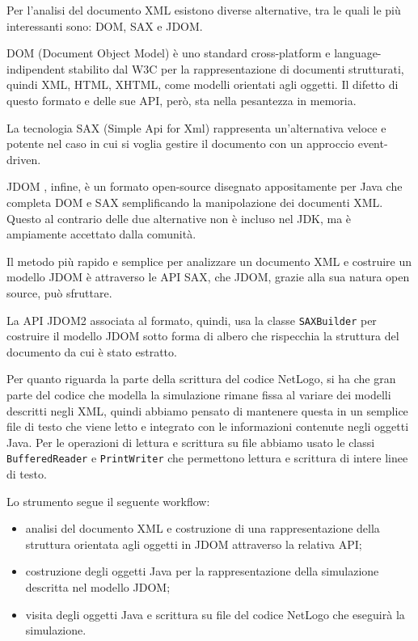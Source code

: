 Per l'analisi del documento XML esistono diverse alternative, tra le quali le più interessanti sono: DOM, SAX e JDOM.

DOM (Document Object Model) è uno standard cross-platform e language-indipendent stabilito dal W3C per la rappresentazione di documenti strutturati, quindi XML, HTML, XHTML, come modelli orientati agli oggetti. Il difetto di questo formato e delle sue API, però, sta nella pesantezza in memoria.

La tecnologia SAX (Simple Api for Xml) rappresenta un'alternativa veloce e potente nel caso in cui si voglia gestire il documento con un approccio event-driven.

JDOM \cite{jdom}, infine, è un formato open-source disegnato appositamente per Java che completa DOM e SAX semplificando la manipolazione dei documenti XML. Questo al contrario delle due alternative non è incluso nel JDK, ma è ampiamente accettato dalla comunità.

Il metodo più rapido e semplice per analizzare un documento XML e costruire un modello JDOM è attraverso le API SAX, che JDOM, grazie alla sua natura open source, può sfruttare.

La API JDOM2 associata al formato, quindi, usa la classe \texttt{SAXBuilder} \cite{sax-builder} per costruire il modello JDOM sotto forma di albero che rispecchia la struttura del documento da cui è stato estratto. 

Per quanto riguarda la parte della scrittura del codice NetLogo, si ha che gran parte del codice che modella la simulazione rimane fissa al variare dei modelli descritti negli XML, quindi abbiamo pensato di mantenere questa in un semplice file di testo che viene letto e integrato con le informazioni contenute negli oggetti Java. Per le operazioni di lettura e scrittura su file abbiamo usato le classi \texttt{BufferedReader} \cite{buffered-reader} e \texttt{PrintWriter} \cite{print-writer} che permettono lettura e scrittura di intere linee di testo.

Lo strumento segue il seguente workflow:
\begin{itemize}
\item analisi del documento XML e costruzione di una rappresentazione della struttura orientata agli oggetti in JDOM attraverso la relativa API;
\item costruzione degli oggetti Java per la rappresentazione della simulazione descritta nel modello JDOM;
\item visita degli oggetti Java e scrittura su file del codice NetLogo che eseguirà la simulazione.
\end{itemize}

